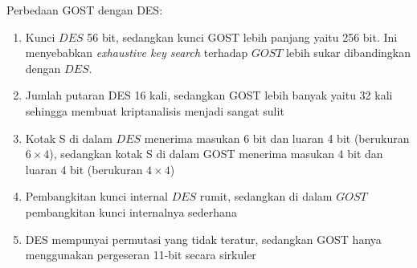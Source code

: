 \documentclass{article}
\begin{document}

Perbedaan GOST dengan DES:

\begin{enumerate}
    \item Kunci $DES$ 56 bit, sedangkan kunci GOST lebih panjang yaitu 256 bit. Ini menyebabkan \textit{exhaustive key search} terhadap $GOST$ lebih sukar dibandingkan dengan $DES$.
    \item Jumlah putaran DES 16 kali, sedangkan GOST lebih banyak yaitu 32 kali sehingga membuat kriptanalisis menjadi sangat sulit
    \item Kotak S di dalam $DES$ menerima masukan 6 bit dan luaran 4 bit (berukuran $6 \times 4$), sedangkan kotak S di dalam GOST menerima masukan 4 bit dan luaran 4 bit (berukuran $4 \times 4$)
    \item Pembangkitan kunci internal $DES$ rumit, sedangkan di dalam $GOST$ pembangkitan kunci internalnya sederhana
    \item DES mempunyai permutasi yang tidak teratur, sedangkan GOST hanya menggunakan pergeseran 11-bit secara sirkuler
\end{enumerate}
\end{document}
